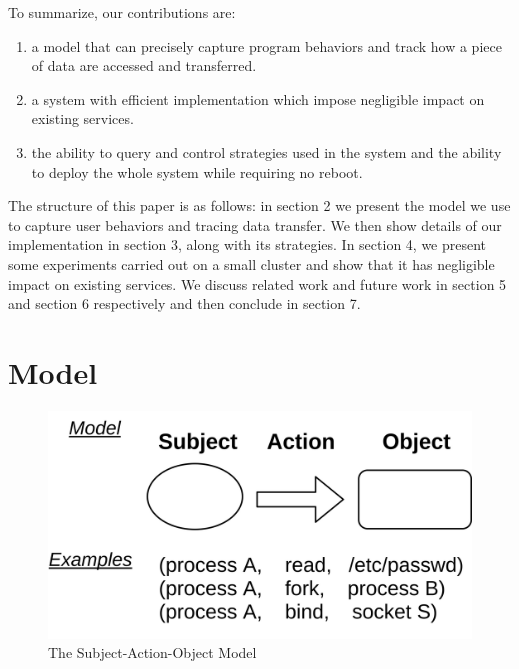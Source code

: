 \documentclass[letterpaper,twocolumn,10pt]{article}
\begin{document}
To summarize, our contributions are:
\begin{enumerate}
    \item a model that can precisely capture program behaviors and track how
        a piece of data are accessed and transferred.
    \item a system with efficient implementation which impose negligible
        impact on existing services.
    \item the ability to query and control strategies used in the system and
        the ability to deploy the whole system while requiring no reboot.
\end{enumerate}

The structure of this paper is as follows: in section 2 we present the model
we use to capture user behaviors and tracing data transfer. We then show
details of our implementation in section 3, along with its strategies. In
section 4, we present some experiments carried out on a small cluster and
show that it has negligible impact on existing services. We discuss related
work and future work in section 5 and section 6 respectively and then
conclude in section 7.


\section{Model} \label{sec:themodel}

\begin{figure}[t]
    \centering
    \includegraphics[scale=0.07]{saomodel}
    \caption{The Subject-Action-Object Model}
    \label{fig:saomodel}
\end{figure}
\end{document}
